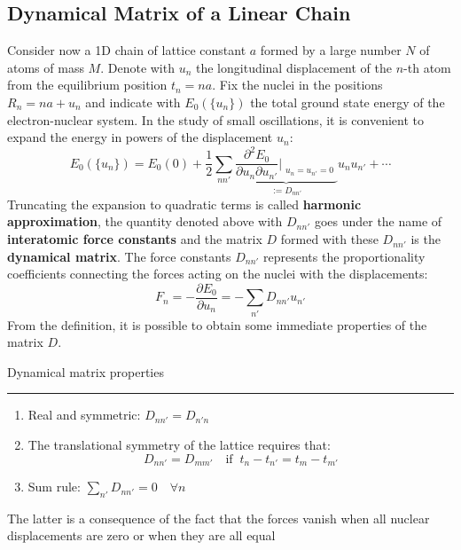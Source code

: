 \documentclass[10.75pt,a4paper,openright,bottom=2cm]{article}
\begin{document}
\subsection{Dynamical Matrix of a Linear Chain}
Consider now a 1D chain of lattice constant $a$ formed by a large number $N$ of atoms of mass $M$. Denote with $u_n$ the longitudinal displacement of the $n$-th atom from the equilibrium position $t_n=na$. Fix the nuclei in the positions $R_n=na+u_n$ and indicate with $E_0(\{u_n\})$ the total ground state energy of the electron-nuclear system. In the study of small oscillations, it is convenient to expand the energy in powers of the displacement $u_n$:
\[
E_0(\{u_n\})=E_0(0)+\frac{1}{2}\sum_{nn'}\underbrace{\frac{\partial^2E_0}{\partial u_n\partial u_{n'}}\Bigr|_{\substack{u_n=u_{n'}=0}}}_{:=D_{nn'}}u_nu_{n'}+\cdots
\]
Truncating the expansion to quadratic terms is called \textbf{harmonic approximation}, the quantity denoted above with $D_{nn'}$ goes under the name of \textbf{interatomic force constants} and the matrix $D$ formed with these $D_{nn'}$ is the \textbf{dynamical matrix}. The force constants $D_{nn'}$ represents the proportionality coefficients connecting the forces acting on the nuclei with the displacements:
\[
F_n=-\frac{\partial E_0}{\partial u_n}=-\sum_{n'}D_{nn'}u_{n'}
\]
From the definition, it is possible to obtain some immediate properties of the matrix $D$.
\begin{mybox}
Dynamical matrix properties
\hrule
\begin{enumerate}\renewcommand{\labelenumi}{\arabic{enumi})}
    \item Real and symmetric: $D_{nn'}=D_{n'n}$
    \item The translational symmetry of the lattice requires that:
    \[
    D_{nn'}=D_{mm'} \quad \text{if}\;\; t_n-t_{n'}=t_m-t_{m'}
    \]
    \item Sum rule: $\sum_{n'}D_{nn'}=0 \quad \forall n$
\end{enumerate}
The latter is a consequence of the fact that the forces vanish when all nuclear displacements are zero or when they are all equal
\end{mybox}
\end{document}
